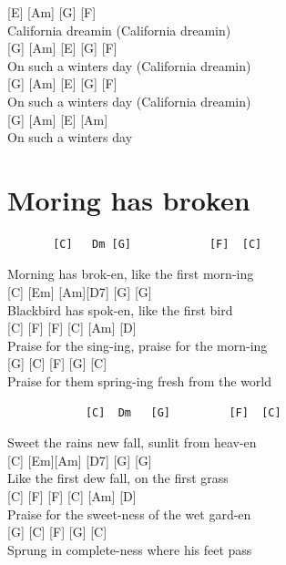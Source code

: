 \documentclass[
  letterpaper,
]{scrbook}
\begin{document}
{[}E{]} {[}Am{]} {[}G{]} {[}F{]}\\
California dreamin (California dreamin\textquotesingle)\\
{[}G{]} {[}Am{]} {[}E{]} {[}G{]} {[}F{]}\\
On such a winter\textquotesingle s day (California
dreamin\textquotesingle)\\
{[}G{]} {[}Am{]} {[}E{]} {[}G{]} {[}F{]}\\
On such a winter\textquotesingle s day (California
dreamin\textquotesingle)\\
{[}G{]} {[}Am{]} {[}E{]} {[}Am{]}\\
On such a winter\textquotesingle s day

\hypertarget{moring-has-broken}{%
\chapter{Moring has broken}\label{moring-has-broken}}

\begin{verbatim}
       [C]   Dm [G]            [F]  [C]
\end{verbatim}

Morning has brok-en, like the first morn-ing\\
{[}C{]} {[}Em{]} {[}Am{]}{[}D7{]} {[}G{]} {[}G{]}\\
Blackbird has spok-en, like the first bird\\
{[}C{]} {[}F{]} {[}F{]} {[}C{]} {[}Am{]} {[}D{]}\\
Praise for the sing-ing, praise for the morn-ing\\
{[}G{]} {[}C{]} {[}F{]} {[}G{]} {[}C{]}\\
Praise for them spring-ing fresh from the world

\begin{verbatim}
            [C]  Dm   [G]         [F]  [C]
\end{verbatim}

Sweet the rain\textquotesingle s new fall, sunlit from heav-en\\
{[}C{]} {[}Em{]}{[}Am{]} {[}D7{]} {[}G{]} {[}G{]}\\
Like the first dew fall, on the first grass\\
{[}C{]} {[}F{]} {[}F{]} {[}C{]} {[}Am{]} {[}D{]}\\
Praise for the sweet-ness of the wet gard-en\\
{[}G{]} {[}C{]} {[}F{]} {[}G{]} {[}C{]}\\
Sprung in complete-ness where his feet pass
\end{document}
